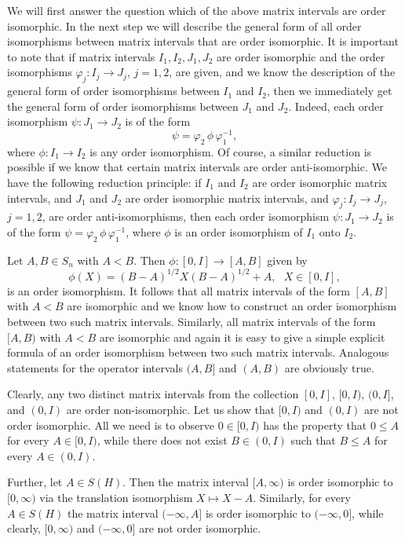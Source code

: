 \documentclass{article}
\begin{document}
We will first answer the question which of the above matrix intervals are order isomorphic. 
In the next step we will describe  the general form of all order isomorphisms between matrix intervals that are order isomorphic.
It is important to note that if matrix intervals $I_1, I_2, J_1 , J_2$ are order isomorphic and the order isomorphisms $\varphi_j : I_j \to J_j$, $j=1,2$, are given, and we know
the description of the general form
of order isomorphisms between $I_1$ and $I_2$, then we immediately get the general form of order isomorphisms between $J_1$ and $J_2$.
Indeed, each order isomorphism $\psi : J_1 \to J_2$ is of the form 
$$
\psi = \varphi_2 \,  \phi \,  \varphi_{1}^{-1},
$$
where $\phi : I_1 \to I_2$ is any order isomorphism. Of course, a similar reduction is possible if we know that certain matrix intervals are order anti-isomorphic.
We have the following reduction principle: if $I_1$ and $I_2$ are order isomorphic matrix intervals, and 
$J_1$ and $J_2$ are order isomorphic matrix intervals, and $\varphi_ j : I_j \to J_j$, $j=1,2$, are order anti-isomorphisms, then 
 each order isomorphism $\psi : J_1 \to J_2$ is of the form 
$\psi = \varphi_2 \,  \phi \,  \varphi_{1}^{-1}$, where $\phi$ is an order isomorphism of $I_1$ onto $I_2$.

Let $A,B \in S_n$ with $A < B$. Then $\phi : [0,I] \to [A,B]$ given by
$$
\phi (X) = (B - A)^{1/2} X  (B - A)^{1/2} 
+ A, \ \ \ X \in [0,I],
$$
is an order isomorphism. It follows that all matrix intervals of the form $[A,B]$ with $A < B$ are isomorphic and we know how to construct an order isomorphism between two such matrix intervals. Similarly, 
all matrix intervals of the form $[A,B)$ with $A < B$ are isomorphic and again it is easy to give a simple explicit formula of  an order isomorphism between two such matrix intervals.
Analogous statements for the operator intervals $(A,B]$ and $(A,B)$ are obviously true.

Clearly, any two distinct matrix intervals from the collection $[0, I]$, $[0, I)$, $(0, I]$, and $(0,I)$ are order non-isomorphic.
Let us show that $[0, I)$ and $(0,I)$ are not order isomorphic. All we need is to observe
$0 \in [0,I)$ has the property that $0 \le A$ for every $A\in [0, I)$, while there does not exist $B \in (0, I)$
such that $B \le A$ for every $A\in (0,I)$.
  
Further, let $A \in S(H)$. Then the matrix interval $[A, \infty )$ is order isomorphic to $[0, \infty)$ via the translation isomorphism $X \mapsto X-A$.
Similarly, for every $A \in S(H)$ the matrix interval  $(-\infty , A ]$ is order isomorphic to $(- \infty, 0]$, while
clearly, $[0, \infty)$ and $(-\infty , 0]$ are not order isomorphic.
\end{document}
